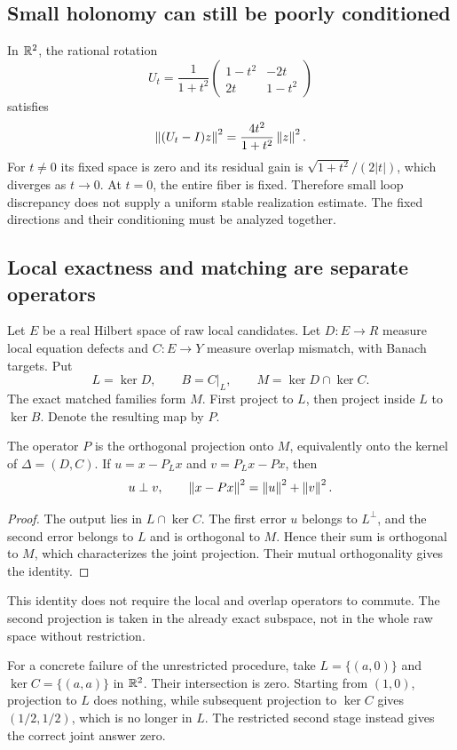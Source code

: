 \subsection{Small holonomy can still be poorly conditioned}
In \(\mathbb R^2\), the rational rotation
\[
 U_t=\frac1{1+t^2}
 \begin{pmatrix}1-t^2&-2t\\2t&1-t^2\end{pmatrix}
\]
satisfies
\[
 \left\lVert(U_t-I)z\right\rVert^2=\frac{4t^2}{1+t^2}\left\lVert z\right\rVert^2.
\]
For \(t\ne0\) its fixed space is zero and its residual gain is \(\sqrt{1+t^2}/(2|t|)\), which diverges as \(t\to0\). At \(t=0\), the entire fiber is fixed. Therefore small loop discrepancy does not supply a uniform stable realization estimate. The fixed directions and their conditioning must be analyzed together.

\label{sec:quantitative}
\subsection{Local exactness and matching are separate operators}
Let \(E\) be a real Hilbert space of raw local candidates. Let \(D:E\to R\) measure local equation defects and \(C:E\to Y\) measure overlap mismatch, with Banach targets. Put
\[
 L=\ker D,\qquad B=C|_L,
 \qquad M=\ker D\cap\ker C.
\]
The exact matched families form \(M\). First project to \(L\), then project inside \(L\) to \(\ker B\). Denote the resulting map by \(P\).

\begin{theorem}\label{KS46}
The operator \(P\) is the orthogonal projection onto \(M\), equivalently onto the kernel of \(\Delta=(D,C)\). If \(u=x-P_Lx\) and \(v=P_Lx-Px\), then
\[
 u\perp v,\qquad\left\lVert x-Px\right\rVert^2=\left\lVert u\right\rVert^2+\left\lVert v\right\rVert^2.
\]
\end{theorem}
\begin{proof}
The output lies in \(L\cap\ker C\). The first error \(u\) belongs to \(L^\perp\), and the second error belongs to \(L\) and is orthogonal to \(M\). Hence their sum is orthogonal to \(M\), which characterizes the joint projection. Their mutual orthogonality gives the identity.
\end{proof}
This identity does not require the local and overlap operators to commute. The second projection is taken in the already exact subspace, not in the whole raw space without restriction.

For a concrete failure of the unrestricted procedure, take \(L=\{(a,0)\}\) and \(\ker C=\{(a,a)\}\) in \(\mathbb R^2\). Their intersection is zero. Starting from \((1,0)\), projection to \(L\) does nothing, while subsequent projection to \(\ker C\) gives \((1/2,1/2)\), which is no longer in \(L\). The restricted second stage instead gives the correct joint answer zero.

